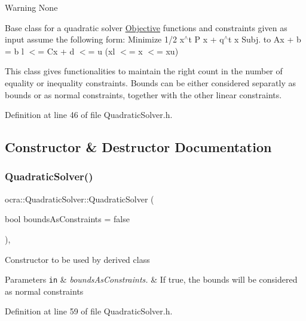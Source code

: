 \begin{DoxyWarning}{Warning}
None
\end{DoxyWarning}
Base class for a quadratic solver \hyperlink{classocra_1_1Objective}{Objective} functions and constraints given as input assume the following form\+: Minimize 1/2 x$^\wedge$t P x + q$^\wedge$t x Subj. to Ax + b = b\textquotesingle{} l $<$= Cx + d $<$= u (xl $<$= x $<$= xu)

This class gives functionalities to maintain the right count in the number of equality or inequality constraints. Bounds can be either considered separatly as bounds or as \textquotesingle{}normal\textquotesingle{} constraints, together with the other linear constraints. 

Definition at line 46 of file Quadratic\+Solver.\+h.



\subsection{Constructor \& Destructor Documentation}
\hypertarget{classocra_1_1QuadraticSolver_a1441484062835e6d3e1a86dbf8fa3eb2}{}\label{classocra_1_1QuadraticSolver_a1441484062835e6d3e1a86dbf8fa3eb2} 
\subsubsection{\texorpdfstring{Quadratic\+Solver()}{QuadraticSolver()}}
{\footnotesize\ttfamily ocra\+::\+Quadratic\+Solver\+::\+Quadratic\+Solver (\begin{DoxyParamCaption}\item[{bool}]{bounds\+As\+Constraints = {\ttfamily false} }\end{DoxyParamCaption})\hspace{0.3cm}{\ttfamily [inline]}, {\ttfamily [protected]}}

Constructor to be used by derived class


\begin{DoxyParams}[1]{Parameters}
\mbox{\tt in}  & {\em bounds\+As\+Constraints.} & If true, the bounds will be considered as normal constraints \\
\hline
\end{DoxyParams}


Definition at line 59 of file Quadratic\+Solver.\+h.



